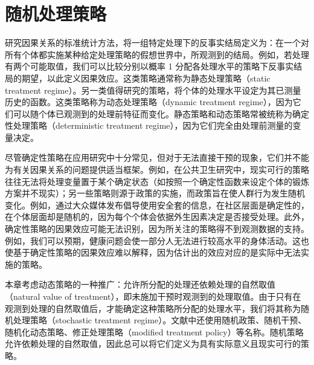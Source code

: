 \chapter{随机处理策略}
\label{ch:stochastic-treatment-regimes}

研究因果关系的标准统计方法，将一组特定处理下的反事实结局定义为：在一个对所有个体都实施某种给定处理策略的假想世界中，所观测到的结局。例如，若处理有两个可能取值，我们可以比较分别以概率 1 分配各处理水平的策略下反事实结局的期望，以此定义因果效应。这类策略通常称为静态处理策略（static treatment regime）。另一类值得研究的策略，将个体的处理水平设定为其已测量历史的函数。这类策略称为动态处理策略（dynamic treatment regime），因为它们可以随个体已观测到的处理前特征而变化。静态策略和动态策略常被统称为确定性处理策略（deterministic treatment regime），因为它们完全由处理前测量的变量决定。

尽管确定性策略在应用研究中十分常见，但对于无法直接干预的现象，它们并不能为有关因果关系的问题提供适当框架。例如，在公共卫生研究中，现实可行的策略往往无法将处理变量置于某个确定状态（如按照一个确定性函数来设定个体的锻炼方案并不现实）；另一些策略则源于政策的实施，而政策旨在使人群行为发生随机变化。例如，通过大众媒体发布倡导使用安全套的信息，在社区层面是确定性的，在个体层面却是随机的，因为每个个体会依据外生因素决定是否接受处理。此外，确定性策略的因果效应可能无法识别，因为所关注的策略得不到观测数据的支持。例如，我们可以预期，健康问题会使一部分人无法进行较高水平的身体活动。这也使基于确定性策略的因果效应难以解释，因为估计出的效应对应的是实际中无法实施的策略。

\begin{sourcebox}
本章考虑动态策略的一种推广：允许所分配的处理还依赖处理的自然取值（natural value of treatment），即未施加干预时观测到的处理取值。由于只有在观测到处理的自然取值后，才能确定这种策略所分配的处理水平，我们将其称为随机处理策略（stochastic treatment regime）。文献中还使用随机政策、随机干预、随机化动态策略、修正处理策略（modified treatment policy）等名称。随机策略允许依赖处理的自然取值，因此总可以将它们定义为具有实际意义且现实可行的策略。
\end{sourcebox}

